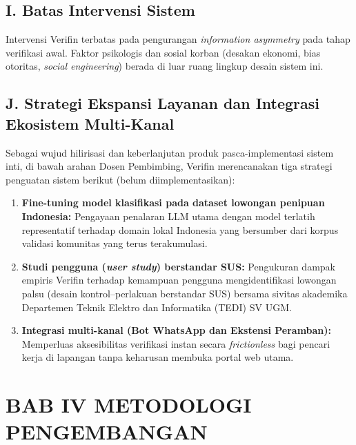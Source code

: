 \documentclass[12pt,a4paper]{article}
\newenvironment{sorotkuning}{%
  \begin{tcolorbox}[
    breakable,
    enhanced,
    frame hidden,
    boxrule=0pt,
    arc=0mm,
    sharp corners,
    colback=yellow!22,
    left=1.5mm, right=1.5mm, top=1.0mm, bottom=1.0mm,
    before skip=1.5pt, after skip=1.5pt
  ]%
}{%
  \end{tcolorbox}%
}
\begin{document}
\subsection*{I. Batas Intervensi Sistem}
Intervensi Verifin terbatas pada pengurangan \textit{information asymmetry} pada tahap
verifikasi awal. Faktor psikologis dan sosial korban (desakan ekonomi, bias otoritas,
\textit{social engineering}) berada di luar ruang lingkup desain sistem ini.

\subsection*{J. Strategi Ekspansi Layanan dan Integrasi Ekosistem Multi-Kanal}

\begin{sorotkuning}
Sebagai wujud hilirisasi dan keberlanjutan produk pasca-implementasi sistem inti, di bawah arahan Dosen Pembimbing, Verifin merencanakan tiga strategi penguatan sistem berikut (belum diimplementasikan):
\begin{enumerate}[label=\textbf{\arabic*.}]
\item \textbf{Fine-tuning model klasifikasi pada dataset lowongan penipuan Indonesia:} Pengayaan penalaran LLM utama dengan model terlatih representatif terhadap domain lokal Indonesia yang bersumber dari korpus validasi komunitas yang terus terakumulasi.
\item \textbf{Studi pengguna (\textit{user study}) berstandar SUS:} Pengukuran dampak empiris Verifin terhadap kemampuan pengguna mengidentifikasi lowongan palsu (desain kontrol--perlakuan berstandar SUS) bersama sivitas akademika Departemen Teknik Elektro dan Informatika (TEDI) SV UGM.
\item \textbf{Integrasi multi-kanal (Bot WhatsApp dan Ekstensi Peramban):} Memperluas aksesibilitas verifikasi instan secara \textit{frictionless} bagi pencari kerja di lapangan tanpa keharusan membuka portal web utama.
\end{enumerate}
\end{sorotkuning}




\section*{BAB IV METODOLOGI PENGEMBANGAN}
\end{document}
